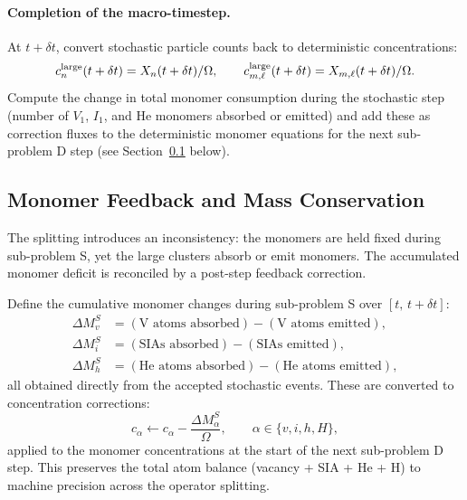 \documentclass[pdflatex,sn-basic]{sn-jnl} %
\begin{document}
\paragraph{Completion of the macro-timestep.}
At $t + \delta t$, convert stochastic particle counts back to
deterministic concentrations:
\begin{equation}\label{eq:stoch_to_det}
    c_n^{\rm large}(t+\delta t)
    = X_n(t+\delta t) / \Omega,
    \qquad
    c_{m,\ell}^{\rm large}(t+\delta t)
    = X_{m,\ell}(t+\delta t) / \Omega.
\end{equation}
Compute the change in total monomer consumption during the stochastic
step (number of $V_1$, $I_1$, and He monomers absorbed or emitted)
and add these as correction fluxes to the deterministic monomer
equations for the next sub-problem D step (see
Section~\ref{sec:hybrid_feedback} below).

\subsection{Monomer Feedback and Mass Conservation}
\label{sec:hybrid_feedback}

The splitting introduces an inconsistency: the monomers are held
fixed during sub-problem S, yet the large clusters absorb or emit
monomers.  The accumulated monomer deficit is reconciled by a
post-step feedback correction.

Define the cumulative monomer changes during sub-problem S over
$[t,\,t+\delta t]$:
\begin{align}
    \Delta M_v^S &= (\text{V atoms absorbed}) - (\text{V atoms emitted}),
    \label{eq:DeltaMv}\\
    \Delta M_i^S &= (\text{SIAs absorbed}) - (\text{SIAs emitted}),
    \label{eq:DeltaMi}\\
    \Delta M_h^S &= (\text{He atoms absorbed}) - (\text{He atoms emitted}),
    \label{eq:DeltaMh}
\end{align}
all obtained directly from the accepted stochastic events.  These
are converted to concentration corrections:
\begin{equation}\label{eq:feedback_correction}
    c_\alpha \leftarrow c_\alpha
    - \frac{\Delta M_\alpha^S}{\Omega},
    \qquad \alpha \in \{v, i, h, H\},
\end{equation}
applied to the monomer concentrations at the start of the next
sub-problem D step.  This preserves the total atom balance
(vacancy + SIA + He + H) to machine precision across the
operator splitting.
\end{document}
